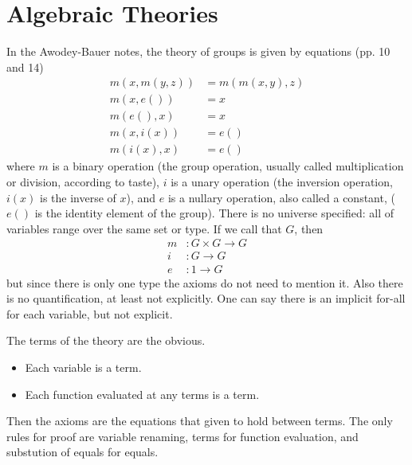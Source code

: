 \documentclass[11pt]{article}
\begin{document}
\section{Algebraic Theories}

In the Awodey-Bauer notes, the theory of groups is given by equations
(pp. 10 and 14)
\begin{subequations}
\begin{align}
   m(x, m(y, z)) & = m(m(x, y), z)
   \label{law:associative}
   \\
   m(x, e()) & = x
   \label{law:right-identity}
   \\
   m(e(), x) & = x
   \label{law:left-identity}
   \\
   m(x, i(x)) & = e()
   \label{law:right-inverse}
   \\
   m(i(x), x) & = e()
   \label{law:left-inverse}
\end{align}
\end{subequations}
where $m$ is a binary operation (the group operation, usually called
multiplication or division, according to taste), $i$ is a unary operation
(the inversion operation, $i(x)$ is the inverse of $x$), and $e$ is a nullary
operation, also called a constant, ($e()$ is the identity element of the
group).  There is no universe specified: all of variables range over the same
set or type.  If we call that $G$, then
\begin{align*}
   m & : G \times G \to G
   \\
   i & : G \to G
   \\
   e & : 1 \to G
\end{align*}
but since there is only one type the axioms do not need to mention it.
Also there is no quantification, at least not explicitly.  One can say
there is an implicit for-all for each variable, but not explicit.

The terms of the theory are the obvious.
\begin{itemize}
\item Each variable is a term.
\item Each function evaluated at any terms is a term.
\end{itemize}
Then the axioms are the equations that given to hold between terms.
The only rules for proof are variable renaming, terms for function evaluation,
and substution of equals for equals.
\end{document}

